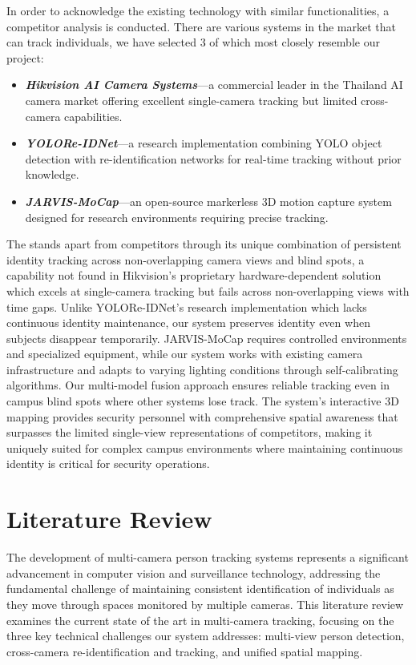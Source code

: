 In order to acknowledge the existing technology with similar functionalities, a competitor analysis is conducted.
There are various systems in the market that can track individuals, we have selected 3 of which most closely resemble our project:

\begin{itemize}
   \item \textbf{\textit{Hikvision AI Camera Systems}}---a commercial leader in the Thailand AI camera market offering excellent single-camera tracking but limited cross-camera capabilities.
   \item \textbf{\textit{YOLORe-IDNet}}---a research implementation combining YOLO object detection with re-identification networks for real-time tracking without prior knowledge.
   \item \textbf{\textit{JARVIS-MoCap}}---an open-source markerless 3D motion capture system designed for research environments requiring precise tracking.
\end{itemize}
\par
The \usevar{\srsTitle} stands apart from competitors through its unique combination of persistent identity tracking across non-overlapping camera views and blind spots, a capability not found in Hikvision's proprietary hardware-dependent solution which excels at single-camera tracking but fails across non-overlapping views with time gaps. Unlike YOLORe-IDNet's research implementation which lacks continuous identity maintenance, our system preserves identity even when subjects disappear temporarily. JARVIS-MoCap requires controlled environments and specialized equipment, while our system works with existing camera infrastructure and adapts to varying lighting conditions through self-calibrating algorithms. Our multi-model fusion approach ensures reliable tracking even in campus blind spots where other systems lose track. The system's interactive 3D mapping provides security personnel with comprehensive spatial awareness that surpasses the limited single-view representations of competitors, making it uniquely suited for complex campus environments where maintaining continuous identity is critical for security operations.

\section{Literature Review}
\label{section:literature-review}

The development of multi-camera person tracking systems represents a significant advancement in computer vision and surveillance technology, addressing the fundamental challenge of maintaining consistent identification of individuals as they move through spaces monitored by multiple cameras. This literature review examines the current state of the art in multi-camera tracking, focusing on the three key technical challenges our system addresses: multi-view person detection, cross-camera re-identification and tracking, and unified spatial mapping.


